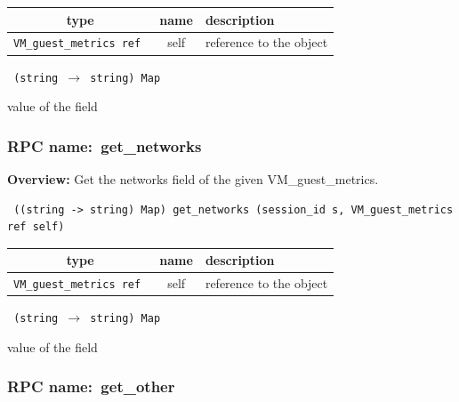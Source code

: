  
\vspace{0.3cm}
\begin{tabular}{|c|c|p{7cm}|}
 \hline
{\bf type} & {\bf name} & {\bf description} \\ \hline
{\tt VM\_guest\_metrics ref } & self & reference to the object \\ \hline 

\end{tabular}

\vspace{0.3cm}

{\tt 
(string $\rightarrow$ string) Map
}


value of the field
\vspace{0.3cm}
\vspace{0.3cm}
\vspace{0.3cm}
\subsubsection{RPC name:~get\_networks}

{\bf Overview:} 
Get the networks field of the given VM\_guest\_metrics.

\begin{verbatim} ((string -> string) Map) get_networks (session_id s, VM_guest_metrics ref self)\end{verbatim}



 
\vspace{0.3cm}
\begin{tabular}{|c|c|p{7cm}|}
 \hline
{\bf type} & {\bf name} & {\bf description} \\ \hline
{\tt VM\_guest\_metrics ref } & self & reference to the object \\ \hline 

\end{tabular}

\vspace{0.3cm}

{\tt 
(string $\rightarrow$ string) Map
}


value of the field
\vspace{0.3cm}
\vspace{0.3cm}
\vspace{0.3cm}
\subsubsection{RPC name:~get\_other}

